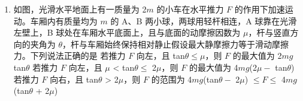 \documentclass[\gkver]{gaokaozhenti}
\begin{document}
\begin{enumerate}
{B．线圈产生感应电动势的最大值 $E_{\text{max}} = nBS \cdot 4\omega$，又 $S = L^{2}$，联立可得 $E_{\text{max}} = 4nBL^{2}\omega$，则线圈产生感应电动势的有效值 $E=\frac{E_{\max}}{\sqrt{2}}=2\sqrt{2}nBL^{2}\omega$，根据串联电路分压原理可知灯泡两端电压有效值为 $U=\frac{RE}{R+R}=\sqrt{2}nBL^{2}\omega$，B 错误；

C．若用总长为原来两倍的相同漆包线重新绕制成边长仍为 $L$ 的多匝正方形线圈，则线圈的匝数变为原来的 2 倍，线圈产生感应电动势的最大值 $E_{\max}^{'} = 8nBL^{2}\omega$，此时线圈产生感应电动势的有效值 $E' = \frac{E_{\max}'}{\sqrt{2}} = 4\sqrt{2}nBL^{2}\omega$，根据电阻定律 $R' = \rho \frac{l}{S'}$，可知线圈电阻变为原来的 2 倍，即为 $2R$，根据串联电路分压原理可得灯泡两端电压有效值 $U' = \frac{RE'}{R + 2R} = \frac{4\sqrt{2}}{3} nBL^{2}\omega$，C 正确；

D．若仅将小轮半径变为原来的两倍，根据 $v = \omega r$ 可知小轮和线圈的角速度变小，根据 $E = \frac{nBS\omega}{\sqrt{2}}$，可知线圈产生的感应电动势有效值变小，则灯泡变暗，D 错误。

故选 AC。
}

\item
如图，光滑水平地面上有一质量为 2$m$ 的小车在水平推力 $F$ 的作用下加速运动。车厢内有质量均为 $m$ 的 A、B 两小球，两球用轻杆相连，A 球靠在光滑左壁上，B 球处在车厢水平底面上，且与底面的动摩擦因数为 $\mu$，杆与竖直方向的夹角为 $\theta$，杆与车厢始终保持相对静止假设最大静摩擦力等于滑动摩擦力。下列说法正确的是
{若推力 $F$ 向左，且 tan$\theta \leq \mu$，则 $F$ 的最大值为 2$mg$tan$\theta$}
{若推力 $F$ 向左，且 $\mu$ < tan$\theta \leq$ 2$\mu$，则 $F$ 的最大值为 4$mg$(2$\mu -$ tan$\theta$)}
{若推力 $F$ 向右，且 tan$\theta$ > 2$\mu$，则 $F$ 的范围为 4$mg$(tan$\theta -$ 2$\mu$) $\leq F \leq$ 4$mg$(tan$\theta$ + 2$\mu$)}
\end{enumerate}
\end{document}
